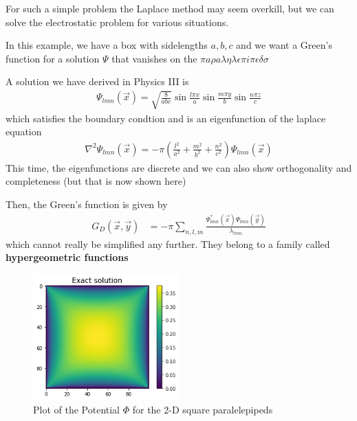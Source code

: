 For such a simple problem the Laplace method may seem overkill, but we can solve the electrostatic problem for various situations.
\begin{ex}
In this example, we have a box with sidelengths $a,b,c$ and we want a Green's function for a solution $\Psi$ that vanishes on the
$\pi a \rho a \lambda \eta \lambda \epsilon \pi i \pi \epsilon \delta \sigma$

A solution we have derived in Physics III is 
\begin{align*}
  \Psi_{lmn}(\vec{x}) = \sqrt{\frac{8}{abc}} \sin \frac{l \pi x}{a} \sin \frac{m \pi y}{b} \sin \frac{n \pi z}{c}
\end{align*}
which satisfies the boundary condtion and is an eigenfunction of the laplace equation
\begin{align*}
  \nabla^{2}\Psi_{lmn}(\vec{x}) = - \pi \left(
    \frac{l^{2}}{a^{2}}+ \frac{m^{2}}{b^{2}}+ \frac{n^{2}}{c^{2}}
  \right)  
  \Psi_{lmn}(\vec{x})
\end{align*}
This time, the eigenfunctions are discrete and we can also show orthogonality and completeness (but that is now shown here)

Then, the Green's function is given by
\begin{align*}
  G_D(\vec{x}, \vec{y})
  &=
  - \pi
  \sum_{n,l,m} \frac{\Psi_{lmn}^{\ast}(\vec{x})\Psi_{lmn}(\vec{y})}{\lambda_{lmn}}
\end{align*}
which cannot really be simplified any further. They belong to a family called \textbf{hypergeometric functions}
\end{ex}

\begin{figure}[h]
\centering
\includegraphics[width=0.5\textwidth]{./img/2d-paralelepipeds.png}
\caption{Plot of the Potential $\Phi$ for the 2-D square paralelepipeds}
\end{figure}

